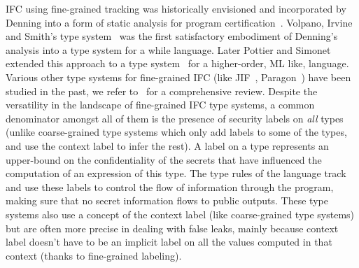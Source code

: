 IFC using fine-grained tracking was historically envisioned and incorporated by Denning into a form
of static analysis for program certification~\cite{purdue75-denning}. Volpano, Irvine and Smith's
type system~\cite{jcs96-volpanoSmith} was the first satisfactory embodiment of Denning's analysis
into a type system for a while language. Later Pottier and Simonet extended this approach to a type
system~\cite{toplas03-flowcaml} for a higher-order, ML like, language. %
Various other type systems for fine-grained IFC (like JIF~\cite{tosem00-jif},
Paragon~\cite{aplas13-paragon}) have been studied in the past, we refer
to~\cite{jsac06-surveySabelfeld} for a comprehensive review. Despite the versatility in the
landscape of fine-grained IFC type systems, a common denominator amongst all of them is the presence
of security labels on \textit{all} types (unlike coarse-grained type systems which only add labels
to some of the types, and use the context label to infer the rest). A label on a type represents an
upper-bound on the confidentiality of the secrets that have influenced the computation of an
expression of this type. The type rules of the language track and use these labels to control the
flow of information through the program, making sure that no secret information flows to public
outputs. These type systems also use a concept of the context label (like coarse-grained type
systems) but are often more precise in dealing with false leaks, mainly because context label
doesn't have to be an implicit label on all the values computed in that context (thanks to
fine-grained labeling). %

